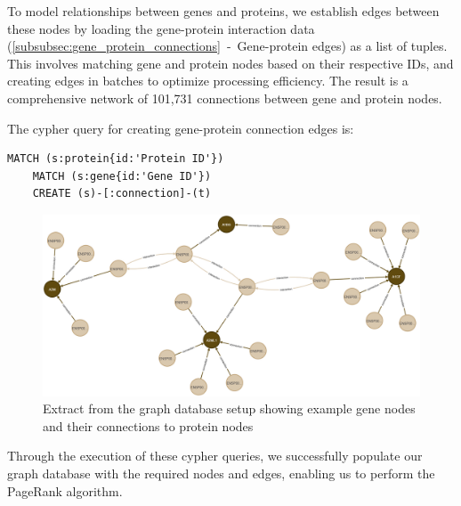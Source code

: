 To model relationships between genes and proteins,
we establish edges between these nodes by loading the gene-protein interaction data
(\ref{subsubsec:gene_protein_connections}~-~Gene-protein edges) as a list of tuples.
This involves matching gene and protein nodes based on their respective IDs,
and creating edges in batches to optimize processing efficiency.
The result is a comprehensive network of 101,731 connections between gene and protein nodes.

The cypher query for creating gene-protein connection edges is:
\begin{lstlisting}[language=Cypher, label={lst:gene_protein_edges}]
    MATCH (s:protein{id:'Protein ID'})
    MATCH (s:gene{id:'Gene ID'})
    CREATE (s)-[:connection]-(t)
\end{lstlisting}

\begin{figure}[h]
    \centering
    \includegraphics[width=1\textwidth]{figures/03_02_Network_2}
    \caption{Extract from the graph database setup showing example gene nodes and their connections to protein nodes}
    \label{fig:03_02_Network_2}
\end{figure}

Through the execution of these cypher queries,
we successfully populate our graph database with the required nodes and edges, enabling us to perform the PageRank algorithm.\\